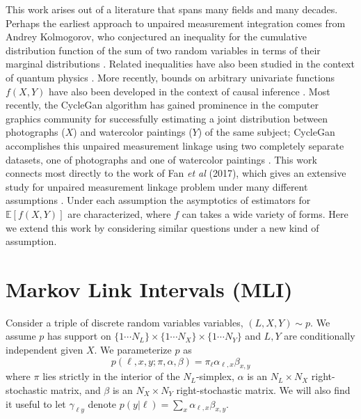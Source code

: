 \documentclass{article}
\theoremstyle{definition}
\begin{document}
This work arises out of a literature that spans many fields and many decades.  Perhaps the earliest approach to unpaired measurement integration comes from Andrey Kolmogorov, who conjectured an inequality for the cumulative distribution function of the sum of two random variables in terms of their marginal distributions \cite{makarov1982estimates}.  Related inequalities have also been studied in the context of quantum physics \cite{chaves2014inferring}.  More recently, bounds on arbitrary univariate functions $f(X,Y)$ have also been developed in the context of causal inference \cite{balke1994counterfactual}.  Most recently, the CycleGan algorithm has gained prominence in the computer graphics community for successfully estimating a joint distribution between photographs ($X$) and watercolor paintings ($Y$) of the same subject; CycleGan accomplishes this unpaired measurement linkage using two completely separate datasets, one of photographs and one of watercolor paintings \cite{zhu2017unpaired}.  This work connects most directly to the work of Fan \emph{et al} (2017), which gives an extensive study for unpaired measurement linkage problem under many different assumptions \cite{FanYan2017}.  Under each assumption the asymptotics of estimators for $\mathbb{E}[f(X,Y)]$ are characterized, where $f$ can takes a wide variety of forms.  Here we extend this work by considering similar questions under a new kind of assumption.

\newcommand{\DX}{\mathcal{D}^X}
\newcommand{\DY}{\mathcal{D}^Y}
\newcommand{\DV}{\mathcal{D}}
\newcommand{\LL}{\mathcal{L}}
\newcommand{\pr}[1]{\mathrm{pr}\left(#1\right)}

                                        


\section{Markov Link Intervals (MLI)}

Consider a triple of discrete random variables variables, $(L,X,Y) \sim p$. We assume $p$ has support on $\{1\cdots N_L\}\times\{1\cdots N_X\}\times\{1\cdots N_Y\}$ and $L,Y$ are conditionally independent given $X$.  
We parameterize $p$ as
\[
p(\ell,x,y;\pi,\alpha,\beta)=\pi_\ell \alpha_{\ell,x} \beta_{x,y}
\]
where $\pi$ lies strictly in the interior of the $N_L$-simplex, $\alpha$ is an $N_L \times N_X$ right-stochastic matrix, and $\beta$ is an $N_X \times N_Y$ right-stochastic matrix.  We will also find it useful to let $\gamma_{\ell y}$ denote $p(y|\ell)=\sum_x \alpha_{\ell,x} \beta_{x,y}$. 
\end{document}
